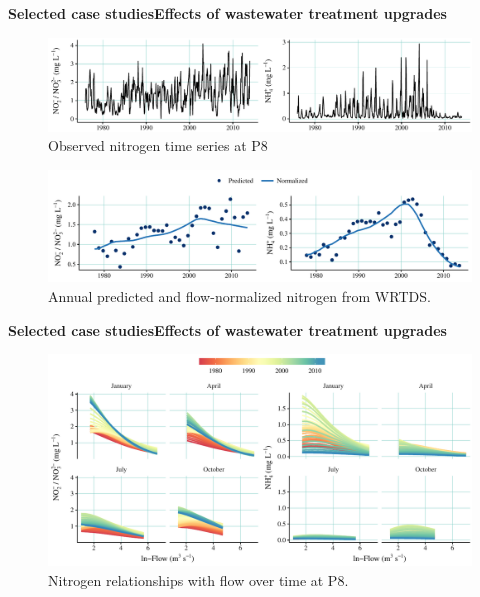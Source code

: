 \documentclass[serif]{beamer}\usepackage[]{graphicx}\usepackage[]{color}
\begin{document}
\begin{frame}{\textbf{Selected case studies}}{\textbf{Effects of wastewater treatment upgrades}}
\onslide<+->
\begin{figure}
\centerline{\includegraphics[width = \textwidth]{fig/p8obs.pdf}}
\caption{Observed nitrogen time series at P8}
\end{figure}
\onslide<+->
\vspace{-0.35in}
\begin{figure}
\centerline{\includegraphics[width = \textwidth]{fig/p8prdnrm.pdf}}
\caption{Annual predicted and flow-normalized nitrogen from WRTDS.}
\end{figure}
\end{frame}

\begin{frame}{\textbf{Selected case studies}}{\textbf{Effects of wastewater treatment upgrades}}
\vspace{0.1in}
\begin{figure}
\centerline{\includegraphics[width = \textwidth]{fig/p8dyna.pdf}}
\caption{Nitrogen relationships with flow over time at P8.}
\end{figure}
\end{frame}
\end{document}
